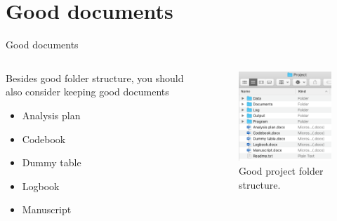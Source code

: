 \section{Good documents}
	\begin{frame}{Good documents}
	\begin{columns}
	\begin{column}{0.5\textwidth}
	Besides good folder structure, you should also consider keeping good documents
		\begin{itemize}
				\item Analysis plan
				\item Codebook\footnotemark
				\item Dummy table
				\item Logbook\footnotemark[\value{footnote}]
				\item Manuscript
		\end{itemize}
	
	\end{column}
	
	\begin{column}{0.5\textwidth}
	\begin{figure}
			\includegraphics[scale=0.4]{image/structure}
			\caption{Good project folder structure.}
	\end{figure}
	\end{column}
	\end{columns}
\end{frame}


